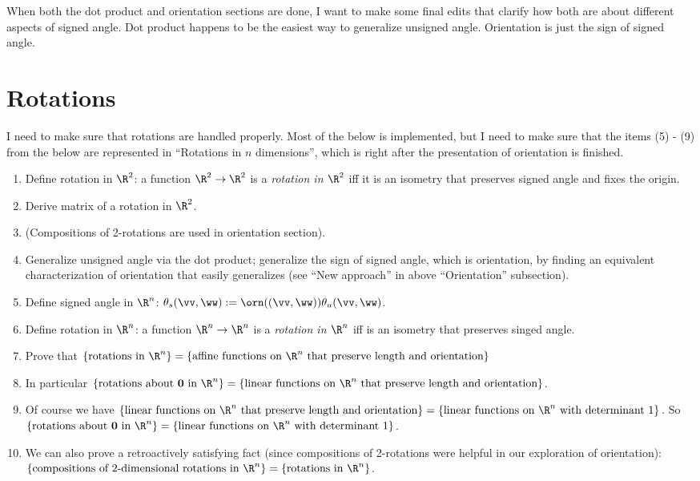 When both the dot product and orientation sections are done, I want to make some final edits that clarify how both are about different aspects of signed angle. Dot product happens to be the easiest way to generalize unsigned angle. Orientation is just the sign of signed angle.

\section*{Rotations}

I need to make sure that rotations are handled properly. Most of the below is implemented, but I need to make sure that the items (5) - (9) from the below are represented in ``Rotations in $n$ dimensions'', which is right after the presentation of orientation is finished.

\begin{enumerate}
	\item Define rotation in $\R^2$: a function $\R^2 \rightarrow \R^2$ is a \textit{rotation in $\R^2$} iff it is an isometry that preserves signed angle and fixes the origin.
	\item Derive matrix of a rotation in $\R^2$.
	\item (Compositions of 2-rotations are used in orientation section).
	\item Generalize unsigned angle via the dot product; generalize the sign of signed angle, which is orientation, by finding an equivalent characterization of orientation that easily generalizes (see ``New approach'' in above ``Orientation'' subsection).
	\item Define signed angle in $\R^n$: $\theta_s(\vv, \ww) := \orn((\vv, \ww)) \theta_u(\vv, \ww)$.
	\item Define rotation in $\R^n$: a function $\R^n \rightarrow \R^n$ is a \textit{rotation in $\R^n$} iff is an isometry that preserves singed angle.
	\item Prove that $\{\text{rotations in $\R^n$}\} = \{ \text{affine functions on $\R^n$ that preserve length and orientation} \}$
	\item In particular $\{\text{rotations about $\mathbf{0}$ in $\R^n$}\} = \{ \text{linear functions on $\R^n$ that preserve length and orientation} \}$.
	\item Of course we have $\{\text{linear functions on $\R^n$ that preserve length and orientation}\} \\ = \{\text{linear functions on $\R^n$ with determinant $1$}\}$. So $\{\text{rotations about $\mathbf{0}$ in $\R^n$}\} \\ = \{\text{linear functions on $\R^n$ with determinant $1$}\}$.
	\item We can also prove a retroactively satisfying fact (since compositions of 2-rotations were helpful in our exploration of orientation): $\{\text{compositions of $2$-dimensional rotations in $\R^n$}\} = \{\text{rotations in $\R^n$}\}$. 
\end{enumerate}


